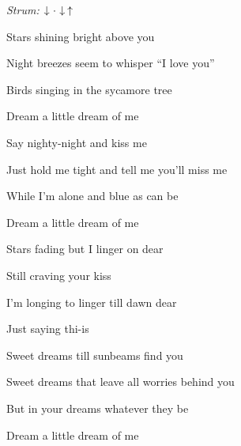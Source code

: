 \begin{song}


\begin{headerbox}
 \quad
\textit{Strum:} $\Down\Miss\Down\Up$
\end{headerbox}

\begin{hchordbox}
\par
{}
\end{hchordbox}

\Large

\bigskip

 Stars shining bright above you \par
{} Night breezes seem to whisper ``I love you'' \par
{} Birds singing in the sycamore tree \par
{}Dream a little dream of me \par

\bigskip

 Say nighty-night and  kiss me \par
{} Just hold me tight and tell me you'll miss me \par
{} While I'm alone and blue as can be \par
{}Dream a little dream of me  \par

\bigskip

 Stars fading but I linger on dear \par
{} Still craving your kiss  \par
{} I'm longing to linger till dawn dear \par
{} Just saying thi-is \par

\bigskip

 Sweet dreams till sunbeams find you \par
{} Sweet dreams that leave all worries behind you \par
{} But in your dreams whatever they be \par
{} Dream a little dream of me  \par


\end{song}

